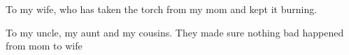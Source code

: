\begin{dedication}
   
   To my wife, who has taken the torch from my mom and kept it burning.

To my uncle, my aunt and my cousins. They made sure nothing bad happened from mom to wife\end{dedication}